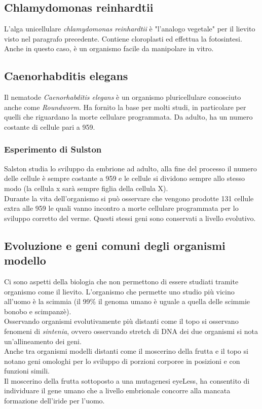    \subsection{Chlamydomonas reinhardtii}
        L'alga unicellulare \textit{chlamydomonas reinhardtii} è "l'analogo vegetale" per il lievito visto nel paragrafo precedente. Contiene cloroplasti ed effettua la fotosintesi. Anche in questo caso, è un organismo facile da manipolare in vitro.
    
    \subsection{Caenorhabditis elegans}
        Il nematode \textit{Caenorhabditis elegans} è un organismo pluricellulare conosciuto anche come \textit{Roundworm}. Ha fornito la base per molti studi, in particolare per quelli che riguardano la morte cellulare programmata. Da adulto, ha un numero costante di cellule pari a 959.
        \subsubsection{Esperimento di Sulston}
            Salston studia lo sviluppo da embrione ad adulto, alla fine del processo il numero delle cellule è sempre costante a 959 e le cellule si dividono sempre allo stesso modo (la cellula x sarà sempre figlia della cellula X).\\
            Durante la vita dell'organismo si può osservare che vengono prodotte 131 cellule extra alle 959 le quali vanno incontro a morte cellulare programmata per lo sviluppo corretto del verme. Questi stessi geni sono conservati a livello evolutivo.
    
    \subsection{Evoluzione e geni comuni degli organismi modello}
        Ci sono aspetti della biologia che non permettono di essere studiati tramite organismo come il lievito. L'organismo che permette uno studio più vicino all'uomo è la scimmia (il 99\% il genoma umano è uguale a quella delle scimmie bonobo e scimpanzè).\\
        Osservando organismi evolutivamente più distanti come il topo si osservano fenomeni di \textit{sintenia}, ovvero osservando stretch di DNA dei due organismi si nota un'allineamento dei geni.\\
        Anche tra organismi modelli distanti come il moscerino della frutta e il topo si notano geni omologhi per lo sviluppo di porzioni corporee in posizioni e con funzioni simili.\\
        Il moscerino della frutta sottoposto a una mutagenesi eyeLess, ha consentito di individuare il gene umano che a livello embrionale concorre alla mancata formazione dell'iride per l'uomo.

\pagebreak